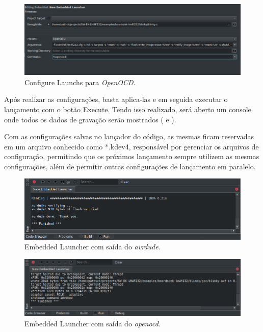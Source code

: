 \begin{figure}[!htb]
  \centering
  \includegraphics[width=1\textwidth]{figuras/openocd.png}
  \caption[\textit{Configure Launchs} para \textit{OpenOCD}]{Configure Launchs para \textit{OpenOCD}.}
  \label{fig:openocd}
\end{figure}

Após realizar as configurações, basta aplica-las e em seguida executar o lançamento com o botão Execute. Tendo isso realizado, será aberto um console onde todos os dados de gravação serão mostrados ( e ).

Com as configurações salvas no lançador do código, as mesmas ficam reservadas em um arquivo conhecido como *.kdev4, responsável por gerenciar os arquivos de configuração, permitindo que os próximos lançamento sempre utilizem as mesmas configurações, além de permitir outras configurações de lançamento em paralelo.

\begin{figure}[!htb]
  \centering
  \includegraphics[width=1\textwidth]{figuras/runavrdude.png}
  \caption[\textit{Embedded Launcher} com \textit{avrdude}]{Embedded Launcher com saída do \textit{avrdude.}}
  \label{fig:runavrdude}
\end{figure}

\begin{figure}[!htb]
  \centering
  \includegraphics[width=1\textwidth]{figuras/runopenocd.png}
  \caption[\textit{Embedded Launcher} com \textit{openocd}]{Embedded Launcher com saída do \textit{openocd.}}
  \label{fig:runopenocd}
\end{figure}

